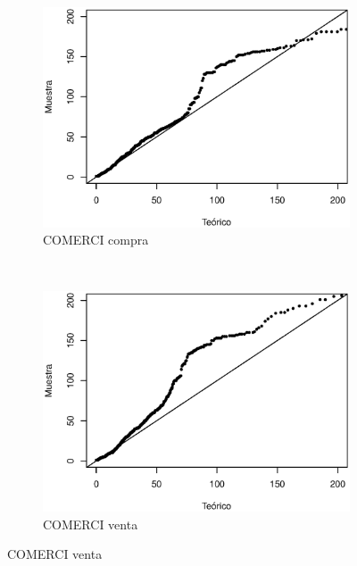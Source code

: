 \documentclass[11pt]{article}
\numberwithin{equation}{section} %
\begin{document}
\begin{figure}[htbp]
\begin{subfigure}[b]{0.5\textwidth}
\centering
\includegraphics[width=\textwidth, trim=0 0.5cm 0 1cm]{comercicanccompraqq.eps}
\caption{COMERCI compra}
\label{fig:comercicanccompraqq}
\end{subfigure}%
~ %
\begin{subfigure}[b]{0.5\textwidth}
\centering
\includegraphics[width=\textwidth, trim=0 0.5cm 0 1cm]{comercicancventaqq.eps}
\caption{COMERCI venta}
\label{fig:comercicancventaqq}
\end{subfigure}


\end{figure}
\end{document}
